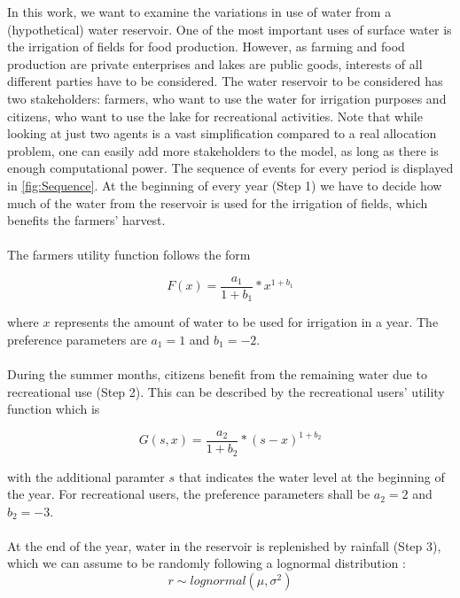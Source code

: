 \documentclass[12pt, a4paper, oneside]{article}
\begin{document}
In this work, we want to examine the variations in use of water from a (hypothetical) water reservoir.
One of the most important uses of surface water is the irrigation of fields for food production. However, as farming and food production are private enterprises and lakes are public goods, interests of all different parties have to be considered.
The water reservoir to be considered has two stakeholders: farmers, who want to use the water for irrigation purposes and citizens, who want to use the lake for recreational activities.
Note that while looking at just two agents is a vast simplification compared to a real allocation problem, one can easily add more stakeholders to the model, as long as there is enough computational power.
The sequence of events for every period is displayed in \ref{fig:Sequence}.
At the beginning of every year (Step 1) we have to decide how much of the water from the reservoir is used for the irrigation of fields, which benefits the farmers' harvest.\\\\
The farmers utility function follows the form 

\begin{equation}
	F(x) = \frac{a_1}{1+b_1} * x^{1+b_1}
\end{equation}

where $x$ represents the amount of water to be used for irrigation in a year. The preference parameters are $a_1 = 1$ and $b_1 = -2$.\\\\

During the summer months, citizens benefit from the remaining water due to recreational use (Step 2).
This can be described by the recreational users' utility function which is

\begin{equation}
  G(s, x) = \frac{a_2}{1+b_2} * (s-x)^{1+b_2}
\end{equation}

with the additional paramter $s$ that indicates the water level at the beginning of the year.
For recreational users, the preference parameters shall be $a_2 = 2$ and $b_2 = -3$.\\\\

At the end of the year, water in the reservoir is replenished by rainfall (Step 3), which we can assume to be randomly following a lognormal distribution \citep{oosterbaan1994frequency}:
\begin{equation}
	r \sim lognormal(\mu, \sigma^2)
\end{equation}
\end{document}

